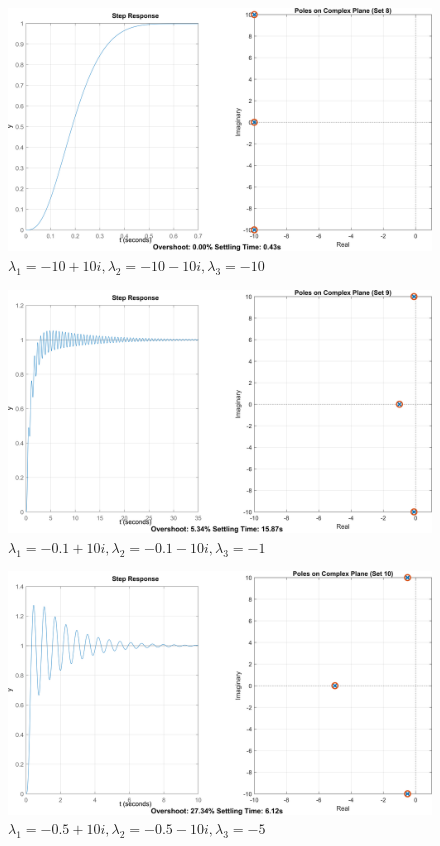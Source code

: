 \begin{figure}[H]
    \centering
    \includegraphics[width=1\textwidth, trim={0cm 0cm 0cm 0cm}]{../images/4_8.png}
    \caption{$\lambda_1 = -10 + 10i, \lambda_2 = -10 - 10i, \lambda_3 = -10$}
\end{figure}

\begin{figure}[H]
    \centering
    \includegraphics[width=1\textwidth, trim={0cm 0cm 0cm 0cm}]{../images/4_9.png}
    \caption{$\lambda_1 = -0.1+ 10i, \lambda_2 = -0.1 - 10i, \lambda_3 = -1$}
\end{figure}

\begin{figure}[H]
    \centering
    \includegraphics[width=1\textwidth, trim={0cm 0cm 0cm 0cm}]{../images/4_10.png}
    \caption{$\lambda_1 = -0.5+ 10i, \lambda_2 = -0.5 - 10i, \lambda_3 = -5$}
\end{figure}


